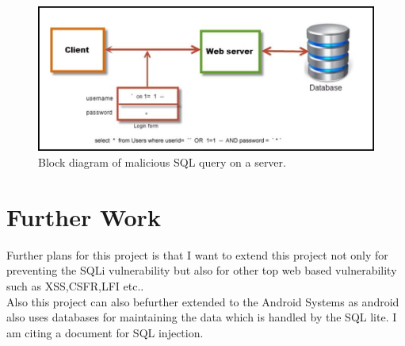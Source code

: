 \documentclass[journal]{IEEEtran}
\begin{document}
\begin{figure}
\centering
\includegraphics[width=1\linewidth]{sql.jpg}
\caption{Block diagram of malicious SQL query on a server.}
\label{fig:block-diagram}
\end{figure}


\section{Further Work}
Further plans for this project is that I want to extend this project not only for preventing the SQLi vulnerability but also for other top web based vulnerability such as XSS,CSFR,LFI etc..\\
Also this project can also befurther extended to the Android Systems as android also uses databases for maintaining the data which is handled by the SQL lite.
I am citing a document for SQL injection.
\cite{halfond2006classification}


 
\end{document}
